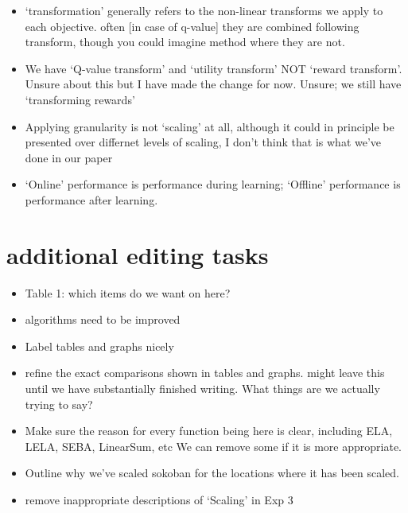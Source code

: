 \begin{itemize}
    \item `transformation' generally refers to the non-linear transforms we apply to each objective. often [in case of q-value] they are combined following transform, though you could imagine method where they are not.
    \item We have `Q-value transform' and `utility transform' NOT `reward transform'. Unsure about this but I have made the change for now. Unsure; we still have `transforming rewards'
    \item Applying granularity is not `scaling' at all, although it could in principle be presented over differnet levels of scaling, I don't think that is what we've done in our paper
    \item `Online' performance is performance during learning; `Offline' performance is performance after learning.
\end{itemize}

 
 
\section*{additional editing tasks}
\begin{itemize}
    \item Table 1: which items do we want on here?
    \item algorithms need to be improved
    \item Label tables and graphs nicely
    \item refine the exact comparisons shown in tables and graphs. might leave this until we have substantially finished writing. What things are we actually trying to say?
    \item Make sure the reason for every function being here is clear, including ELA, LELA, SEBA, LinearSum, etc We can remove some if it is more appropriate.
    \item Outline why we've scaled sokoban for the locations where it has been scaled.
    \item remove inappropriate descriptions of `Scaling' in Exp 3
\end{itemize}
 